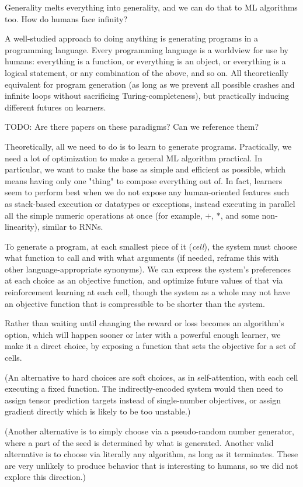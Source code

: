 \documentclass{article}
\begin{document}
Generality melts everything into generality, and we can do that to ML algorithms too. How do humans face infinity?

A well-studied approach to doing anything is generating programs in a programming language. Every programming language is a worldview for use by humans: everything is a function, or everything is an object, or everything is a logical statement, or any combination of the above, and so on. All theoretically equivalent for program generation (as long as we prevent all possible crashes and infinite loops without sacrificing Turing-completeness), but practically inducing different futures on learners.

    TODO: Are there papers on these paradigms? Can we reference them?

Theoretically, all we need to do is to learn to generate programs. Practically, we need a lot of optimization to make a general ML algorithm practical. In particular, we want to make the base as simple and efficient as possible, which means having only one "thing" to compose everything out of. In fact, learners seem to perform best when we do not expose any human-oriented features such as stack-based execution or datatypes or exceptions, instead executing in parallel all the simple numeric operations at once (for example, $+$, $*$, and some non-linearity), similar to RNNs.

To generate a program, at each smallest piece of it (\textit{cell}), the system must choose what function to call and with what arguments (if needed, reframe this with other language-appropriate synonyms). We can express the system's preferences at each choice as an objective function, and optimize future values of that via reinforcement learning at each cell, though the system as a whole may not have an objective function that is compressible to be shorter than the system.

Rather than waiting until changing the reward or loss becomes an algorithm's option, which will happen sooner or later with a powerful enough learner, we make it a direct choice, by exposing a function that sets the objective for a set of cells.

(An alternative to hard choices are soft choices, as in self-attention, with each cell executing a fixed function. The indirectly-encoded system would then need to assign tensor prediction targets instead of single-number objectives, or assign gradient directly which is likely to be too unstable.)

(Another alternative is to simply choose via a pseudo-random number generator, where a part of the seed is determined by what is generated. Another valid alternative is to choose via literally any algorithm, as long as it terminates. These are very unlikely to produce behavior that is interesting to humans, so we did not explore this direction.)
\end{document}
